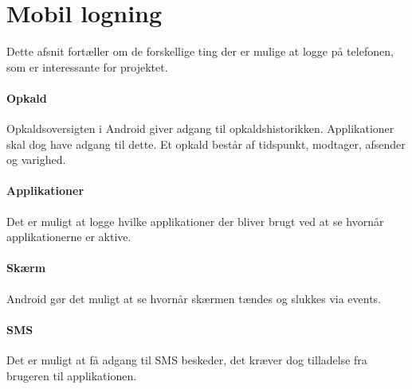 \section{Mobil logning}\label{logning}
Dette afsnit fortæller om de forskellige ting der er mulige at logge på telefonen, som er interessante for projektet.

\paragraph{Opkald}
Opkaldsoversigten i Android giver adgang til opkaldshistorikken.
Applikationer skal dog have adgang til dette.
Et opkald består af tidspunkt, modtager, afsender og varighed.

\paragraph{Applikationer}
Det er muligt at logge hvilke applikationer der bliver brugt ved at se hvornår applikationerne er aktive.

\paragraph{Skærm}
Android gør det muligt at se hvornår skærmen tændes og slukkes via events.  

\paragraph{SMS}
Det er muligt at få adgang til SMS beskeder, det kræver dog tilladelse fra brugeren til applikationen.